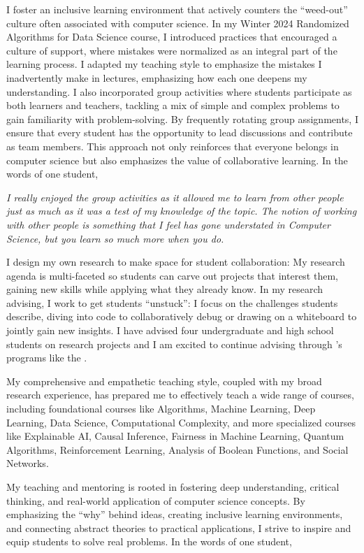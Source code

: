 \documentclass[11pt]{article}
\begin{document}
{I foster an inclusive learning environment that actively counters the “weed-out” culture often associated with computer science. In my Winter 2024 Randomized Algorithms for Data Science course, I introduced practices that encouraged a culture of support, where mistakes were normalized as an integral part of the learning process. I adapted my teaching style to emphasize the mistakes I inadvertently make in lectures, emphasizing how each one deepens my understanding. I also incorporated group activities where students participate as both learners and teachers, tackling a mix of simple and complex problems to gain familiarity with problem-solving. By frequently rotating group assignments, I ensure that every student has the opportunity to lead discussions and contribute as team members. This approach not only reinforces that everyone belongs in computer science but also emphasizes the value of collaborative learning. In the words of one student,

\begin{displayquote}
	\textit{I really enjoyed the group activities as it allowed me to learn from other people just as much as it was a test of my knowledge of the topic. The notion of working with other people is something that I feel has gone understated in Computer Science, but you learn so much more when you do.}
\end{displayquote}

I design my own research to make space for student collaboration: My research agenda is multi-faceted so students can carve out projects that interest them, gaining new skills while applying what they already know. In my research advising, I work to get students “unstuck”: I focus on the challenges students describe, diving into code to collaboratively debug or drawing on a whiteboard to jointly gain new insights. I have advised four undergraduate and high school students on research projects and I am excited to continue advising through \school’s programs like the \program.

My comprehensive and empathetic teaching style, coupled with my broad research experience, has prepared me to effectively teach a wide range of courses, including foundational courses like Algorithms, Machine Learning, Deep Learning, Data Science, Computational Complexity, and more specialized courses like Explainable AI, Causal Inference, Fairness in Machine Learning, Quantum Algorithms, Reinforcement Learning, Analysis of Boolean Functions, and Social Networks.

My teaching and mentoring is rooted in fostering deep understanding, critical thinking, and real-world application of computer science concepts. By emphasizing the ``why'' behind ideas, creating inclusive learning environments, and connecting abstract theories to practical applications, I strive to inspire and equip students to solve real problems. In the words of one student,

}
\end{document}
